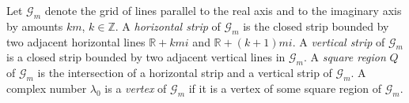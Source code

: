 Let $\mathcal{G}_m$ denote the grid of lines parallel to the real axis and to the imaginary axis by amounts $km$, $k \in \mathbb{Z}$. A \textit{horizontal strip} of $\mathcal{G}_m$ is the closed strip bounded by two adjacent horizontal lines $\mathbb{R} + kmi$ and $\mathbb{R} + (k + 1)mi$. A \textit{vertical strip} of $\mathcal{G}_m$ is a closed strip bounded by two adjacent vertical lines in $\mathcal{G}_m$. A \textit{square region} $Q$ of $\mathcal{G}_m$ is the intersection of a horizontal strip and a vertical strip of $\mathcal{G}_m$. A complex number $\lambda_0$ is a \textit{vertex} of $\mathcal{G}_m$ if it is a vertex of some square region of $\mathcal{G}_m$.
